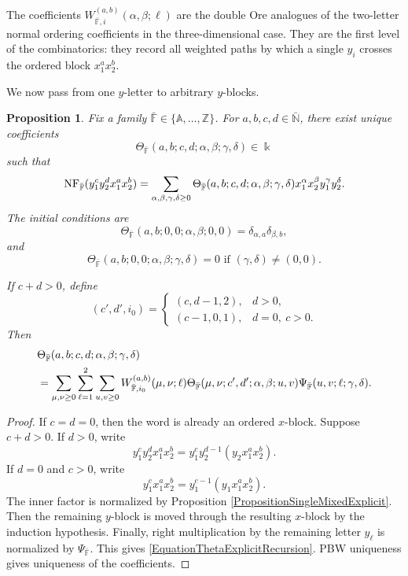 \documentclass{amsart}
\newtheorem{proposition}[theorem]{Proposition}
\theoremstyle{definition}
\theoremstyle{remark}
\numberwithin{equation}{section}
\begin{document}
The coefficients $W_{\bar{\mathbb{F}},i}^{(a,b)}(\alpha,\beta;\ell)$ are the double Ore analogues of the two-letter normal ordering coefficients in the three-dimensional case. They are the first level of the combinatorics: they record all weighted paths by which a single $y_i$ crosses the ordered block $x_1^ax_2^b$.

We now pass from one $y$-letter to arbitrary $y$-blocks.

\begin{proposition}\label{PropositionMixedBlockExplicit}
Fix a family $\bar{\mathbb{F}}\in\{\mathbb{A},\ldots,\mathbb{Z}\}$. For $a,b,c,d\in\bar{\mathbb{N}}$, there exist unique coefficients
\[
\Theta_{\bar{\mathbb{F}}}(a,b;c,d;\alpha,\beta;\gamma,\delta)\in\Bbbk
\]
such that
\begin{equation}\label{EquationThetaExplicitExpansion}
{\rm NF}_{\bar{\mathbb{F}}}(y_1^cy_2^dx_1^ax_2^b)
=
\sum_{\alpha,\beta,\gamma,\delta\ge0}
\Theta_{\bar{\mathbb{F}}}(a,b;c,d;\alpha,\beta;\gamma,\delta)
x_1^\alpha x_2^\beta y_1^\gamma y_2^\delta.
\end{equation}
The initial conditions are
\[
\Theta_{\bar{\mathbb{F}}}(a,b;0,0;\alpha,\beta;0,0)
=
\delta_{\alpha,a}\delta_{\beta,b},
\]
and
\[
\Theta_{\bar{\mathbb{F}}}(a,b;0,0;\alpha,\beta;\gamma,\delta)=0
\text{ if }(\gamma,\delta)\neq(0,0).
\]

If $c+d>0$, define
\[
(c',d',i_0)=
\begin{cases}
(c,d-1,2), & d>0,\\
(c-1,0,1), & d=0,\ c>0.
\end{cases}
\]
Then
\begin{align}
&\Theta_{\bar{\mathbb{F}}}(a,b;c,d;\alpha,\beta;\gamma,\delta)
\notag\\
&=
\sum_{\mu,\nu\ge0}
\sum_{\ell=1}^{2}
\sum_{u,v\ge0}
W_{\bar{\mathbb{F}},i_0}^{(a,b)}(\mu,\nu;\ell)
\Theta_{\bar{\mathbb{F}}}(\mu,\nu;c',d';\alpha,\beta;u,v)
\Psi_{\bar{\mathbb{F}}}(u,v;\ell;\gamma,\delta).
\label{EquationThetaExplicitRecursion}
\end{align}
\end{proposition}

\begin{proof}
If $c=d=0$, then the word is already an ordered $x$-block. Suppose $c+d>0$. If $d>0$, write
\[
y_1^cy_2^dx_1^ax_2^b
=
y_1^cy_2^{d-1}(y_2x_1^ax_2^b).
\]
If $d=0$ and $c>0$, write
\[
y_1^cx_1^ax_2^b
=
y_1^{c-1}(y_1x_1^ax_2^b).
\]
The inner factor is normalized by Proposition \ref{PropositionSingleMixedExplicit}. Then the remaining $y$-block is moved through the resulting $x$-block by the induction hypothesis. Finally, right multiplication by the remaining letter $y_\ell$ is normalized by $\Psi_{\bar{\mathbb{F}}}$. This gives \eqref{EquationThetaExplicitRecursion}. PBW uniqueness gives uniqueness of the coefficients.
\end{proof}
\end{document}
